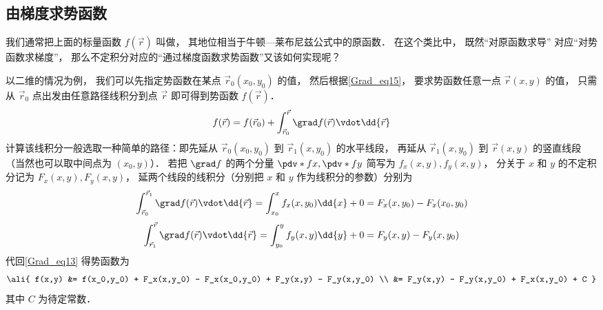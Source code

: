 \subsection{由梯度求势函数}
我们通常把上面的标量函数 $f(\vec r)$ 叫做， 其地位相当于牛顿—莱布尼兹公式中的原函数． 在这个类比中， 既然“对原函数求导” 对应“对势函数求梯度”， 那么不定积分对应的“通过梯度函数求势函数”又该如何实现呢？

以二维的情况为例， 我们可以先指定势函数在某点 $\vec r_0 (x_0,y_0)$ 的值， 然后根据\autoref{Grad_eq15}， 要求势函数任意一点 $\vec r (x,y)$ 的值， 只需从 $\vec r_0$ 点出发由任意路径线积分到点 $\vec r$ 即可得到势函数 $f(\vec r)$．
\begin{equation}\label{Grad_eq13}
f(\vec r) =  f(\vec r_0) + \int_{\vec r_0}^{\vec r} \grad f(\vec r) \vdot \dd{\vec r} 
\end{equation}
计算该线积分一般选取一种简单的路径：即先延从 $\vec r_0(x_0,y_0)$ 到 $\vec r_1(x, y_0)$ 的水平线段， 再延从 $\vec r_1(x, y_0)$ 到 $\vec r(x,y)$ 的竖直线段（当然也可以取中间点为 $(x_0,y)$）． 若把 $\grad f$ 的两个分量 $\pdv*{f}{x}, \pdv*{f}{y}$ 简写为 $f_x(x,y), f_y(x,y)$， 分关于 $x$ 和 $y$ 的不定积分记为 $F_x(x,y), F_y(x,y)$， 延两个线段的线积分（分别把 $x$ 和 $y$ 作为线积分的参数）分别为
\begin{equation}
 \int_{\vec r_0}^{\vec r_1} \grad f(\vec r) \vdot \dd{\vec r} = \int_{x_0}^{x} f_x(x,y_0) \dd{x} + 0 = F_x(x,y_0) - F_x(x_0,y_0)
\end{equation}
\begin{equation}
 \int_{\vec r_1}^{\vec r} \grad f(\vec r) \vdot \dd{\vec r} = \int_{y_0}^{y} f_y(x,y) \dd{y} + 0 = F_y(x,y) - F_y(x,y_0)
\end{equation}
代回\autoref{Grad_eq13} 得势函数为
\begin{equation}\label{Grad_eq23}\ali{
f(x,y) &= f(x_0,y_0) + F_x(x,y_0) - F_x(x_0,y_0) + F_y(x,y) - F_y(x,y_0) \\
&= F_y(x,y) - F_y(x,y_0) + F_x(x,y_0) + C
}\end{equation}
其中 $C$ 为待定常数．


